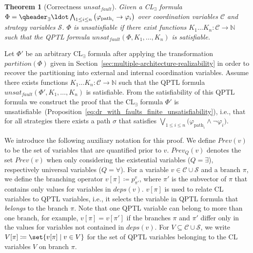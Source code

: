 \documentclass{LMCS}
\newcommand{\deps}{\mathit{deps}}
\newcommand{\unsatnf}{\mathit{unsat}_\mathit{fault}}
\newcommand{\partition}{\mathit{partition}}
\newcommand{\Prev}{\mathit{Prev}}
\theoremstyle{plain}\newtheorem{theorem}[thm]{Theorem}
\theoremstyle{plain}\newtheorem{lemma}[thm]{Lemma}
\theoremstyle{plain}\newtheorem{proposition}[thm]{Proposition}
\theoremstyle{plain}\newtheorem{corollary}[thm]{Corollary}
\theoremstyle{definition}\newtheorem{definition}{Definition}[section]
\begin{document}
\begin{theorem}[Correctness $\unsatnf$] \label{thm:correctness_unsatnf}
  Given a CL$_\exists$ formula $\Phi = \qheader_\exists \ldot \bigwedge_{1 \leq i \leq n} \big( \varphi_{\text{path}_i} \allowbreak \rightarrow \varphi_i \big)$ over coordination variables $\mathcal{C}$ and strategy variables $\mathcal{S}$.
  $\Phi$ is unsatisfiable if there exist functions $K_1 \dots K_n : \mathcal{C} \rightarrow \mathbb{N}$ such that the QPTL formula $\unsatnf(\Phi, K_1, \dots, K_n)$ is satisfiable.
\end{theorem}
\proof
  Let $\Phi'$ be an arbitrary CL$_\exists$ formula after applying the transformation $\partition(\Phi)$ given in Section~\ref{sec:multiple-architecture-realizability} in order to recover the partitioning into external and internal coordination variables.
  Assume there exists functions $K_1 \dots K_n : \mathcal{C} \rightarrow \mathbb{N}$ such that the QPTL formula $\unsatnf(\Phi',\allowbreak K_1, \dots, K_n)$ is satisfiable.
  From the satisfiability of this QPTL formula we construct the proof that the CL$_\exists$ formula $\Phi'$ is unsatisfiable~(Proposition~\ref{eq:dr_with_faults_finite_unsatisfiability}), i.e., that for all strategies there exists a path $\sigma$ that satisfies $\bigvee_{1 \leq i \leq n} \big( \varphi_{\text{path}_i} \land \neg\varphi_i \big)$.
  
  We introduce the following auxiliary notation for this proof.
  We define $\Prev(v)$ to be the set of variables that are quantified prior to $v$.
  $\Prev_Q(v)$ denotes the set $\Prev(v)$ when only considering the existential variables ($Q=\exists$), respectively universal variables ($Q=\forall$).
  For a variable $v \in \mathcal{C} \cup \mathcal{S}$ and a branch $\pi$, we define the branching operator $v[\pi] \coloneqq p^v_{\pi'}$, where $\pi'$ is the subvector of $\pi$ that contains only values for variables in $\deps(v)$.
  $v[\pi]$ is used to relate CL variables to QPTL variables, i.e., it selects the variable in QPTL formula that \emph{belongs} to the branch $\pi$.
  Note that one QPTL variable can belong to more than one branch, for example, $v[\pi] = v[\pi']$ if the branches $\pi$ and $\pi'$ differ only in the values for variables not contained in $\deps(v)$.
  For $V \subseteq \mathcal{C} \cup \mathcal{S}$, we write $V[\pi] \coloneqq \set{ v[\pi] \mid v \in V}$ for the set of QPTL variables belonging to the CL variables $V$ on branch $\pi$.
\end{document}
